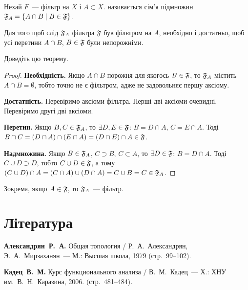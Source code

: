 \begin{definition}
    Нехай $F$~--- фільтр на $X$ і $A \subset X$.  називається сім'я підмножин $\frak F_A = \{ A \cap B \mid B \in \frak F\}$.
\end{definition}

\begin{theorem}
    \label{th:filter-restriction-criterion}
    Для того щоб слід $\frak F_A$ фільтра $\frak F$ був фільтром на $A$, необхідно і достатньо, щоб усі перетини $A \cap B$, $B \in \frak F$ були непорожніми.
\end{theorem}

\begin{exercise}
    Доведіть цю теорему.
\end{exercise}
\begin{proof}
    \textbf{Необхідність.} Якщо $A \cap B$ порожня для якогось $B \in \frak F$, то $\frak F_A$ містить $A \cap B = \emptyset$, тобто точно не є фільтром, адже не задовольняє першу аксіому. 
    
    \textbf{Достатність.} Перевіримо аксіоми фільтра. Перші дві аксіоми очевидні. Перевіримо другі дві аксіоми. 
    
    \textbf{Перетин.} Якщо $B, C \in \frak F_A$, то $\exists D, E \in \frak F$: $B = D \cap A$, $C = E \cap A$. Тоді $B \cap C = (D \cap A) \cap (E \cap A) = (D \cap E) \cap A \in \frak F$. 
    
    \textbf{Надмножина.} Якщо $B \in \frak F_A$, $C \supset B$, $C \subset A$, то $\exists D \in \frak F$: $B = D \cap A$. Тоді $C \cup D \supset D$, тобто $C \cup D \in \frak F$, а тому $(C \cup D) \cap A = (C \cap A) \cup (D \cap A) = C \cup B = C \in \frak F_A$.
\end{proof}

\begin{corollary}
    Зокрема, якщо $A \in \frak F$, то $\frak F_A$~--- фільтр.
\end{corollary}

\section{Література}

\begin{enumerate}[label={[\arabic*]}]
\item \textbf{Александрян~Р.~А.}
Общая топология /
Р.~А.~Александрян, Э.~А.~Мирзаханян~---
М.: Высшая школа, 1979 (стр.~99--102).
\item \textbf{Кадец~В.~М.}
Курс функционального анализа /
В.~М.~Кадец~---
Х.: ХНУ им.~В.~Н.~Каразина, 2006. (стр.~481--484).
\end{enumerate}
